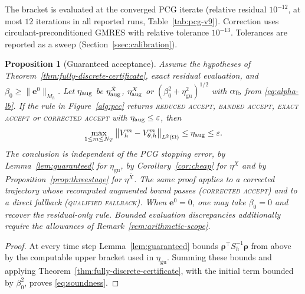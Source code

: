 \documentclass[11pt]{amsart}
\newtheorem{proposition}[theorem]{Proposition}
\theoremstyle{remark}
\newcommand{\Mh}{M_h}
\newcommand{\Sh}{S_h}
\newcommand{\norm}[1]{\left\lVert #1\right\rVert}
\newcommand{\etaGuar}{\eta_{\mathrm{gu}}}
\newcommand{\ee}{\mathbf e}
\newcommand{\rr}{\bm\rho}
\begin{document}
The bracket is evaluated at the converged PCG iterate (relative residual $10^{-12}$, at most
$12$ iterations in all reported runs, Table~\ref{tab:pcg-v9}).  Correction uses circulant-preconditioned GMRES with
relative tolerance $10^{-13}$.  Tolerances are reported as a sweep (Section~\ref{ssec:calibration}).
\begin{proposition}[Guaranteed acceptance]
\label{prop:two-stage}
Assume the hypotheses of Theorem~\ref{thm:fully-discrete-certificate},
exact residual evaluation, and $\beta_0\ge\|\ee^0\|_{\Mh}$. Let $\eta_{\rm aug}$ be
$\eta^{\bar X}_{\rm aug}$, $\eta^X_{\rm aug}$ or $(\beta_0^2+\etaGuar^2)^{1/2}$ with $\alpha_{\rm lb}$ from \eqref{eq:alpha-lb}.
If the rule in Figure~\ref{alg:pcc} returns
\textsc{reduced accept}, \textsc{banded accept}, \textsc{exact accept} or \textsc{corrected accept} with $\eta_{\rm aug}\le\varepsilon$, then
\begin{equation}
  \max_{1\le m\le N_T}\norm{V_h^m-V_{\theta,h}^m}_{L^2(\Omega)}
  \le \eta_{\rm aug}\le\varepsilon .
  \label{eq:soundness}
\end{equation}
The conclusion is independent of the PCG stopping error, by Lemma~\ref{lem:guaranteed} for
$\etaGuar$, by Corollary~\ref{cor:cheap} for $\eta^X$ and by Proposition~\ref{prop:threestage} for $\eta^{\bar X}$. The same proof
applies to a corrected trajectory whose recomputed augmented bound passes
(\textsc{corrected accept}) and to a direct fallback (\textsc{qualified fallback}).
When $\ee^0=0$, one may take $\beta_0=0$ and recover the residual-only
rule. Bounded evaluation discrepancies additionally require the allowances
of Remark~\ref{rem:arithmetic-scope}.
\end{proposition}

\begin{proof}
At every time step Lemma~\ref{lem:guaranteed} bounds
$\rr^\top\Sh^{-1}\rr$ from above by the computable upper bracket used in
$\etaGuar$.  Summing these bounds and applying
Theorem~\ref{thm:fully-discrete-certificate}, with the initial term bounded
by $\beta_0^2$, proves \eqref{eq:soundness}.  
\end{proof}
\end{document}
